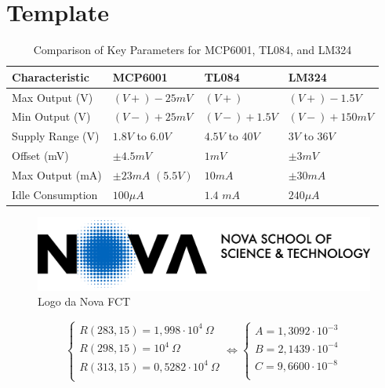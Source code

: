 \section{Template}

\begin{table}[h]
    \centering
    \caption{Comparison of Key Parameters for MCP6001, TL084, and LM324}
    \begin{tabularx}{\textwidth}{>{\centering\arraybackslash}X >{\centering\arraybackslash}X >{\centering\arraybackslash}X >{\centering\arraybackslash}X}
        \toprule
        \textbf{Characteristic} & \textbf{MCP6001} & \textbf{TL084} & \textbf{LM324} \\
        \midrule
        Max Output (V) & $(V+)-25mV$ & $(V+)$ & $(V+) - 1.5V$ \\
        \midrule
        Min Output (V) & $(V-)+25mV$ & $(V-) + 1.5V$ & $(V-) + 150mV$ \\
        \midrule
        Supply Range (V) & $1.8V$ to $6.0V$ & $4.5V$ to $40V$ & $3V$ to $36V$ \\
        \midrule
        Offset (mV) & $\pm 4.5mV$ & $1mV$ & $\pm 3 mV$ \\
        \midrule
        Max Output (mA) & $\pm 23 mA$ $(5.5V)$ & $10 mA$ & $\pm 30 mA$ \\
        \midrule
        Idle Consumption & $100 \mu A $ & $1.4$ $mA$ & $240 \mu A$ \\
        \bottomrule
    \end{tabularx}
    \label{tab:opamp}
\end{table}
\begin{figure}[H]
    \centering
    \includegraphics*[scale = 0.05]{Images/NovaFctHor.png}
    \caption{Logo da Nova FCT}
    \label{wrap-fig:1}
\end{figure}

\begin{equation}
    \begin{cases}
    
        R( 283,15 ) = 1,998\cdot 10^4 ~\Omega \\
        R( 298,15 ) = 10^4 ~\Omega\\
        R( 313,15 ) = 0,5282 \cdot 10^4 ~\Omega\\
    
    \end{cases}
    \Leftrightarrow
    \begin{cases}
        A = 1,3092 \cdot 10^{-3}\\
        B = 2,1439 \cdot 10^{-4}\\
        C = 9,6600 \cdot 10^{-8}\\
    
    \end{cases}
\end{equation}

